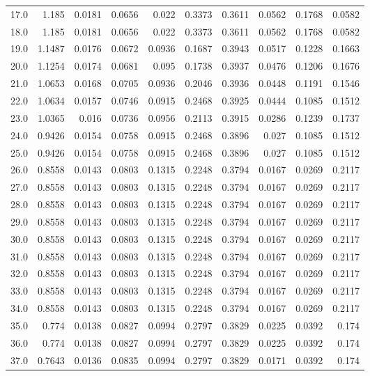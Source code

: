 \begin{longtable}{lrrrrrrrrr}
17.0 & 1.185 & 0.0181 & 0.0656 & 0.022 & 0.3373 & 0.3611 & 0.0562 & 0.1768 & 0.0582 \\
18.0 & 1.185 & 0.0181 & 0.0656 & 0.022 & 0.3373 & 0.3611 & 0.0562 & 0.1768 & 0.0582 \\
19.0 & 1.1487 & 0.0176 & 0.0672 & 0.0936 & 0.1687 & 0.3943 & 0.0517 & 0.1228 & 0.1663 \\
20.0 & 1.1254 & 0.0174 & 0.0681 & 0.095 & 0.1738 & 0.3937 & 0.0476 & 0.1206 & 0.1676 \\
21.0 & 1.0653 & 0.0168 & 0.0705 & 0.0936 & 0.2046 & 0.3936 & 0.0448 & 0.1191 & 0.1546 \\
22.0 & 1.0634 & 0.0157 & 0.0746 & 0.0915 & 0.2468 & 0.3925 & 0.0444 & 0.1085 & 0.1512 \\
23.0 & 1.0365 & 0.016 & 0.0736 & 0.0956 & 0.2113 & 0.3915 & 0.0286 & 0.1239 & 0.1737 \\
24.0 & 0.9426 & 0.0154 & 0.0758 & 0.0915 & 0.2468 & 0.3896 & 0.027 & 0.1085 & 0.1512 \\
25.0 & 0.9426 & 0.0154 & 0.0758 & 0.0915 & 0.2468 & 0.3896 & 0.027 & 0.1085 & 0.1512 \\
26.0 & 0.8558 & 0.0143 & 0.0803 & 0.1315 & 0.2248 & 0.3794 & 0.0167 & 0.0269 & 0.2117 \\
27.0 & 0.8558 & 0.0143 & 0.0803 & 0.1315 & 0.2248 & 0.3794 & 0.0167 & 0.0269 & 0.2117 \\
28.0 & 0.8558 & 0.0143 & 0.0803 & 0.1315 & 0.2248 & 0.3794 & 0.0167 & 0.0269 & 0.2117 \\
29.0 & 0.8558 & 0.0143 & 0.0803 & 0.1315 & 0.2248 & 0.3794 & 0.0167 & 0.0269 & 0.2117 \\
30.0 & 0.8558 & 0.0143 & 0.0803 & 0.1315 & 0.2248 & 0.3794 & 0.0167 & 0.0269 & 0.2117 \\
31.0 & 0.8558 & 0.0143 & 0.0803 & 0.1315 & 0.2248 & 0.3794 & 0.0167 & 0.0269 & 0.2117 \\
32.0 & 0.8558 & 0.0143 & 0.0803 & 0.1315 & 0.2248 & 0.3794 & 0.0167 & 0.0269 & 0.2117 \\
33.0 & 0.8558 & 0.0143 & 0.0803 & 0.1315 & 0.2248 & 0.3794 & 0.0167 & 0.0269 & 0.2117 \\
34.0 & 0.8558 & 0.0143 & 0.0803 & 0.1315 & 0.2248 & 0.3794 & 0.0167 & 0.0269 & 0.2117 \\
35.0 & 0.774 & 0.0138 & 0.0827 & 0.0994 & 0.2797 & 0.3829 & 0.0225 & 0.0392 & 0.174 \\
36.0 & 0.774 & 0.0138 & 0.0827 & 0.0994 & 0.2797 & 0.3829 & 0.0225 & 0.0392 & 0.174 \\
37.0 & 0.7643 & 0.0136 & 0.0835 & 0.0994 & 0.2797 & 0.3829 & 0.0171 & 0.0392 & 0.174 \\

\end{longtable}
